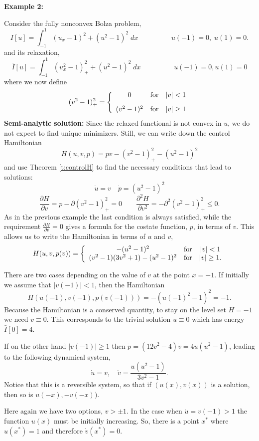 \documentclass[11pt]{article}
\theoremstyle{plain}
\begin{document}

{\bf \large Example 2:} 

Consider the fully nonconvex Bolza problem,
\[ I[u] = \int_{-1}^1 (u_x-1)^2 + (u^2-1)^2\;dx \hspace{2cm} u(-1) =0,\; u(1) =0.\]
and its relaxation,
\[ \bar{I}[u] = \int_{-1}^1 (u_x^2-1)^2_+ + (u^2-1)^2\;dx \hspace{2cm} u(-1) = 0, u(1) =0\]
where we now define
\[ (v^2-1)^2_+= \left \{ \begin{array}{c c c}
0 & \mbox{for} & |v|<1\\[2ex]
(v^2-1)^2 & \mbox{for} & |v| \geq1
\end{array} \right.
\]
{\bf Semi-analytic solution:} Since the relaxed functional is not convex in $u$, we do not expect to find unique minimizers. Still, we can write down the control Hamiltonian 
\[ H(u,v,p) = pv - (v^2-1)^2_+ - (u^2-1)^2\]
and use Theorem \ref{t:controlH} to find the necessary conditions that lead to solutions:
\[ \dot{u} = v \quad \dot{p} = (u^2-1)^2\]
\[ \frac{\partial H}{\partial v} = p - \partial(v^2-1)^2_+ =0 \qquad \frac{\partial^2 H}{\partial v^2} = -\partial^2(v^2-1)^2_+ \leq 0.\]
As in the previous example the last condition is always satisfied, while the requirement $\frac{\partial H}{\partial v} =0$ gives a formula for the costate function, $p$, in terms of $v$. This allows us to write the Hamiltonian in terms of $u$ and $v$,
\[ H(u,v,p(v) ) = \left \{\begin{array}{c c c}
 -(u^2-1)^2 & \mbox{for} & |v| <1\\
 (v^2-1)(3v^2+1) - (u^2-1)^2 & \mbox{for} & |v| \geq 1.
 \end{array} \right.
 \]

There are two cases depending on the value of $v$ at the point $x =-1$.  If initially we assume that $|v(-1)|<1$, then the Hamiltonian 
$$H(u(-1),v(-1),p(v(-1))) = -(u(-1)^2-1)^2=-1.$$ Because the Hamiltonian is a conserved quantity, to stay on the level set $H=-1$ we need $v\equiv 0$. This corresponds to the trivial solution $u \equiv 0$ which has energy $\bar{I}[0] = 4$. 

If on the other hand $|v(-1)|\geq 1$ then $\dot{p} = (12v^2-4) \dot{v} = 4u(u^2-1) $, leading to the following dynamical system,
\[ \dot{u} = v, \quad \dot{v} = \frac{u(u^2-1)}{3v^2-1}.\]
Notice that this is a reversible system, so that if $(u(x),v(x))$ is a solution, then so is $u(-x),-v(-x))$. 

Here again we have two options, $v > \pm 1$. In the case when $\dot{u} = v(-1)>1$ the function $u(x)$ must be initially increasing. So, there is a point $x^*$ where $u(x^*) =1$ and therefore $\dot{v}(x^*)=0$. 
\end{document}
